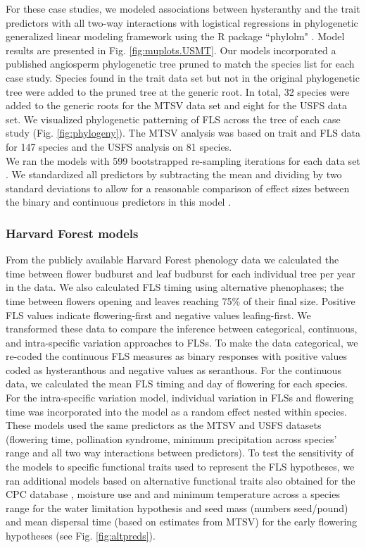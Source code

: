 \documentclass[11pt]{article}
\begin{document}
\noindent For these case studies, we modeled associations between hysteranthy and the trait predictors with all two-way interactions with logistical regressions in phylogenetic generalized linear modeling framework \citep{Ives2010} using the R package ``phylolm" \citep{Ho2014}. Model results are presented in Fig. \ref{fig:muplots.USMT}. Our models incorporated a published angiosperm phylogenetic tree \citep{Zanne2013} pruned to match the species list for each case study. Species found in the trait data set but not in the original phylogenetic tree were added to the pruned tree at the generic root. In total, 32 species were added to the generic roots for the MTSV data set and eight for the USFS data set. We visualized phylogenetic patterning of FLS across the tree of each case study (Fig. \ref{fig:phylogeny}). The MTSV analysis was based on trait and FLS data for 147 species and the USFS analysis on 81 species. \\

\noindent We ran the models with 599 bootstrapped re-sampling iterations for each data set \citep{Wilcox2010}. We standardized all predictors by subtracting the mean and dividing by two standard deviations to allow for a reasonable comparison of effect sizes between the binary and continuous predictors in this model \citep{Gelman2007}. 


\subsubsection*{Harvard Forest models}
\noindnent From the publicly available Harvard Forest phenology data \citep{OKeefe2015} we calculated the time between flower budburst and leaf budburst for each individual tree per year in the data. We also calculated FLS timing using alternative phenophases; the time between flowers opening and leaves reaching 75\% of their final size. Positive FLS values indicate flowering-first and negative values leafing-first. We transformed these data to compare the inference between categorical, continuous, and intra-specific variation approaches to FLSs. To make the data categorical, we re-coded the continuous FLS measures as binary responses with positive values coded as hysteranthous and negative values as seranthous. For the continuous data, we calculated the mean FLS timing and day of flowering for each species. For the intra-specific variation model, individual variation in FLSs and flowering time was incorporated into the model as a random effect nested within species. These models used the same predictors as the MTSV and USFS datasets (flowering time, pollination syndrome, minimum precipitation across species' range and all two way interactions between predictors). To test the sensitivity of the models to specific functional traits used to represent the FLS hypotheses, we ran additional models based on alternative functional traits also obtained for the CPC database \citep{usdancrs}, moisture use and and minimum temperature across a species range for the water limitation hypothesis and seed mass (numbers seed/pound) and mean dispersal time (based on estimates from MTSV) for the early flowering hypotheses (see Fig. \ref{fig:altpreds}).\\
\end{document}

